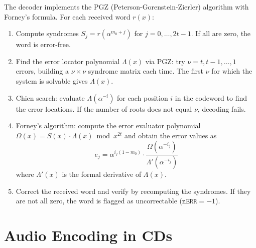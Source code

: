 \documentclass[11pt,a4paper]{article}
\begin{document}
The decoder implements the PGZ (Peterson-Gorenstein-Zierler) algorithm with Forney's formula. For each received word $r(x)$:

\begin{enumerate}
    \item Compute syndromes $S_j = r(\alpha^{m_0+j})$ for $j = 0, \ldots, 2t-1$. If all are zero, the word is error-free.

    \item Find the error locator polynomial $\Lambda(x)$ via PGZ: try $\nu = t, t-1, \ldots, 1$ errors, building a $\nu \times \nu$ syndrome matrix each time. The first $\nu$ for which the system is solvable gives $\Lambda(x)$.

    \item Chien search: evaluate $\Lambda(\alpha^{-i})$ for each position $i$ in the codeword to find the error locations. If the number of roots does not equal $\nu$, decoding fails.

    \item Forney's algorithm: compute the error evaluator polynomial $\Omega(x) = S(x) \cdot \Lambda(x) \bmod x^{2t}$ and obtain the error values as
    \[
    e_j = \alpha^{i_j(1-m_0)} \cdot \frac{\Omega(\alpha^{-i_j})}{\Lambda'(\alpha^{-i_j})}
    \]
    where $\Lambda'(x)$ is the formal derivative of $\Lambda(x)$.

    \item Correct the received word and verify by recomputing the syndromes. If they are not all zero, the word is flagged as uncorrectable ($\texttt{nERR} = -1$).
\end{enumerate}

\section{Audio Encoding in CDs}
\end{document}
